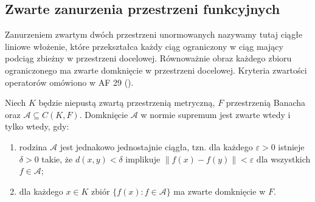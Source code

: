\subsection{Zwarte zanurzenia przestrzeni funkcyjnych}

Zanurzeniem zwartym dwóch przestrzeni unormowanych
nazywamy tutaj ciągłe liniowe włożenie, które
przekształca każdy ciąg ograniczony w ciąg mający
podciąg zbieżny w przestrzeni docelowej.
Równoważnie obraz każdego zbioru ograniczonego
ma zwarte domknięcie w przestrzeni docelowej.
Kryteria zwartości operatorów omówiono w AF 29
().

\begin{twierdzenie}
\label{ma2:thm:ascoli-compact}
Niech $K$ będzie niepustą zwartą przestrzenią
metryczną, $F$ przestrzenią Banacha oraz
$\mathcal A\subseteq C(K,F)$.
Domknięcie $\mathcal A$ w normie supremum
jest zwarte wtedy i tylko wtedy, gdy:
\begin{enumerate}
 \item rodzina $\mathcal A$ jest jednakowo
 jednostajnie ciągła, tzn. dla każdego
 $\varepsilon>0$ istnieje $\delta>0$ takie,
 że $d(x,y)<\delta$ implikuje
 $\|f(x)-f(y)\|<\varepsilon$ dla wszystkich
 $f\in\mathcal A$;
 \item dla każdego $x\in K$ zbiór
 $\{f(x):f\in\mathcal A\}$ ma zwarte
 domknięcie w $F$.
\end{enumerate}
\end{twierdzenie}
